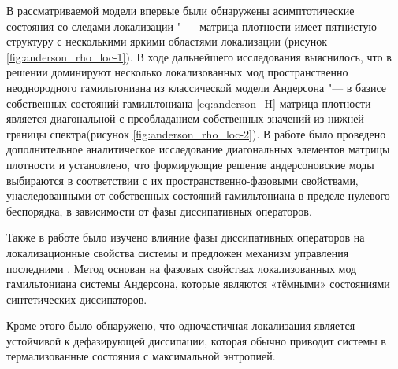 В рассматриваемой модели впервые были обнаружены асимптотические состояния со следами локализации \cite{Yusipov2017}" --- матрица плотности имеет пятнистую структуру с несколькими яркими областями локализации (рисунок \cref{fig:anderson_rho_loc-1}). 
В ходе дальнейшего исследования выяснилось, что в решении доминируют несколько локализованных мод пространственно неоднородного гамильтониана из классической модели Андерсона "--- в базисе собственных состояний гамильтониана \cref{eq:anderson_H} матрица плотности является диагональной с преобладанием собственных значений из нижней границы спектра(рисунок \cref{fig:anderson_rho_loc-2}). 
В работе было проведено дополнительное аналитическое исследование диагональных элементов матрицы плотности и установлено, что формирующие решение андерсоновские моды выбираются в соответствии с их пространственно-фазовыми свойствами, унаследованными от собственных состояний гамильтониана в пределе нулевого беспорядка, в зависимости от фазы диссипативных операторов.

Также в работе было изучено влияние фазы диссипативных операторов на локализационные свойства системы и предложен механизм управления последними \cite{Vershinina2017}. 
Метод основан на фазовых свойствах локализованных мод гамильтониана системы
Андерсона, которые являются «тёмными» состояниями синтетических диссипаторов.

Кроме этого было обнаружено, что одночастичная локализация является устойчивой к дефазирующей диссипации, которая обычно приводит системы в термализованные состояния с максимальной энтропией.

